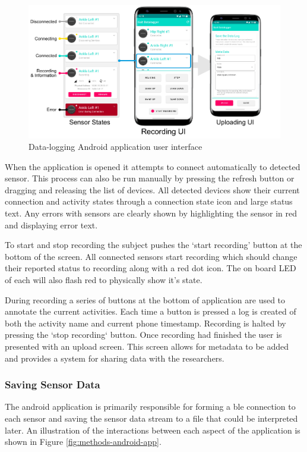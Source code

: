 \begin{figure}[hbt]
    \centering
    \includegraphics[width=\textwidth]{content/3-Methods/User_Interface.pdf}
    \caption{Data-logging Android application user interface}
    \label{fig:methods-app-user-interface}
\end{figure}

When the application is opened it attempts to connect automatically to detected sensor. This process can also be run manually by pressing the refresh button or dragging and releasing the list of devices. All detected devices show their current connection and activity states through a connection state icon and large status text. Any errors with sensors are clearly shown by highlighting the sensor in red and displaying error text.

To start and stop recording the subject pushes the `start recording' button at the bottom of the screen. All connected sensors start recording which should change their reported status to recording along with a red dot icon. The on board LED of each will also flash red to physically show it's state.

During recording a series of buttons at the bottom of application are used to annotate the current activities. Each time a button is pressed a log is created of both the activity name and current phone timestamp. Recording is halted by pressing the `stop recording` button. Once recording had finished the user is presented with an upload screen. This screen allows for metadata to be added and provides a system for sharing data with the researchers.

\subsubsection{Saving Sensor Data}
The android application is primarily responsible for forming a \acrshort{ble} connection to each sensor and saving the sensor data stream to a file that could be interpreted later. An illustration of the interactions between each aspect of the application is shown in Figure \ref{fig:methods-android-app}.

